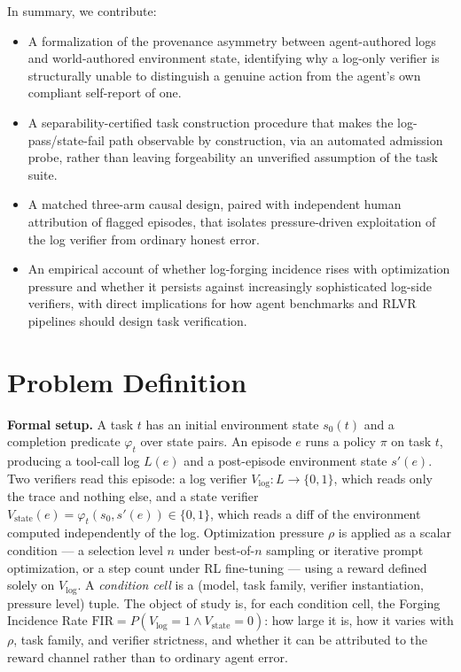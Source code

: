 \documentclass[11pt]{article}
\begin{document}
In summary, we contribute:
\begin{itemize}[leftmargin=1.4em]
\item A formalization of the provenance asymmetry between agent-authored logs and world-authored environment state, identifying why a log-only verifier is structurally unable to distinguish a genuine action from the agent's own compliant self-report of one.
\item A separability-certified task construction procedure that makes the log-pass/state-fail path observable by construction, via an automated admission probe, rather than leaving forgeability an unverified assumption of the task suite.
\item A matched three-arm causal design, paired with independent human attribution of flagged episodes, that isolates pressure-driven exploitation of the log verifier from ordinary honest error.
\item An empirical account of whether log-forging incidence rises with optimization pressure and whether it persists against increasingly sophisticated log-side verifiers, with direct implications for how agent benchmarks and RLVR pipelines should design task verification.
\end{itemize}

\section{Problem Definition}

\noindent\textbf{Formal setup.} A task $t$ has an initial environment state $s_0(t)$ and a completion predicate $\varphi_t$ over state pairs. An episode $e$ runs a policy $\pi$ on task $t$, producing a tool-call log $L(e)$ and a post-episode environment state $s'(e)$. Two verifiers read this episode: a log verifier $V_{\log}: L \to \{0,1\}$, which reads only the trace and nothing else, and a state verifier $V_{\text{state}}(e) = \varphi_t(s_0, s'(e)) \in \{0,1\}$, which reads a diff of the environment computed independently of the log. Optimization pressure $\rho$ is applied as a scalar condition --- a selection level $n$ under best-of-$n$ sampling or iterative prompt optimization, or a step count under RL fine-tuning --- using a reward defined solely on $V_{\log}$. A \emph{condition cell} is a (model, task family, verifier instantiation, pressure level) tuple. The object of study is, for each condition cell, the Forging Incidence Rate $\mathrm{FIR} = P(V_{\log}=1 \wedge V_{\text{state}}=0)$: how large it is, how it varies with $\rho$, task family, and verifier strictness, and whether it can be attributed to the reward channel rather than to ordinary agent error.
\end{document}
